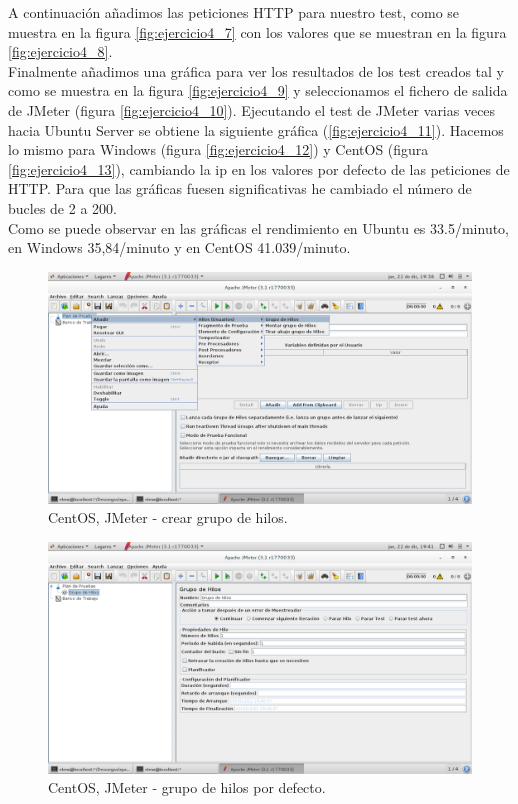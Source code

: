 A continuación añadimos las peticiones HTTP para nuestro test, como se muestra en la figura \ref{fig:ejercicio4_7} con los valores que se muestran en la figura \ref{fig:ejercicio4_8}.\\

Finalmente añadimos una gráfica para ver los resultados de los test creados tal y como se muestra en la figura \ref{fig:ejercicio4_9} y seleccionamos el fichero de salida de JMeter (figura \ref{fig:ejercicio4_10}). Ejecutando el test de JMeter varias veces hacia Ubuntu Server se obtiene la siguiente gráfica (\ref{fig:ejercicio4_11}). Hacemos lo mismo para Windows (figura \ref{fig:ejercicio4_12}) y CentOS (figura \ref{fig:ejercicio4_13}), cambiando la ip en los valores por defecto de las peticiones de HTTP. Para que las gráficas fuesen significativas he cambiado el número de bucles de 2 a 200.\\

Como se puede observar en las gráficas el rendimiento en Ubuntu es 33.5/minuto, en Windows 35,84/minuto y en CentOS 41.039/minuto.


\begin{figure}[H] 
	\centering
	\includegraphics[width=14.7cm]{./img/ejercicio4_1.png} 	
	\caption{CentOS, JMeter - crear grupo de hilos.} \label{fig:ejercicio4_1}
\end{figure}

\begin{figure}[H] 
	\centering
	\includegraphics[width=14.7cm]{./img/ejercicio4_2.png} 	
	\caption{CentOS, JMeter - grupo de hilos por defecto.} \label{fig:ejercicio4_2}
\end{figure}

